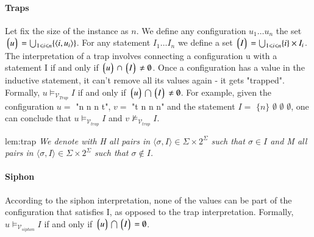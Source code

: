 \paragraph*{Traps} 
Let fix the size of the instance as $n$. We define any configuration 
$u_1 \dots u_n$ the set $\left\lgroup u \right\rgroup = \bigcup_{1 \leqslant i \leqslant n} \lbrace\langle i, u_i \rangle \rbrace$.
For any statement $I_1 \dots I_n$ we define a set $\left\lgroup I \right\rgroup = \bigcup_{1 \leqslant i \leqslant n} \lbrace i \rbrace \times I_i$.
The interpretation of a trap involves connecting a configuration u with a statement I if and only if
$\left\lgroup u \right\rgroup \cap \left\lgroup I \right\rgroup \neq \emptyset$.
Once a configuration has a value in the inductive statement, it can't remove all its values again - 
it gets "trapped". Formally, $u \models_{\mathcal{V}_{Trap}} I$ if and only if $\left\lgroup u \right\rgroup \bigcap \left\lgroup I \right\rgroup \neq \emptyset$.
For example, given the configuration $u = $ "n n n t", $v = $ "t n n n" and the statement $I =$ $\{n\} \,\, \emptyset \,\, \emptyset \,\, \emptyset$,
one can conclude that $u \models_{\mathcal{V}_{trap}} I$ and $v \not\models_{\mathcal{V}_{trap}} I$.
\begin{lem}{lem:trap}
    \textit{We denote with H all pairs in $\langle \sigma, I \rangle \in \Sigma \times 2^{\Sigma}$
    such that  $\sigma \in I$ and M all pairs in $\langle \sigma, I \rangle \in \Sigma \times 2^{\Sigma}$
    such that  $\sigma \notin I$.}

\end{lem}

\paragraph*{Siphon}
According to the siphon interpretation, none of the values can be part of the configuration that satisfies I, as opposed to the trap interpretation.
Formally, $u \models_{\mathcal{V}_{siphon}} I$ if and only if  $\left\lgroup u \right\rgroup \bigcap \left\lgroup I \right\rgroup = \emptyset$.

